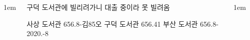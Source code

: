\documentclass[	20pt, 
							a1paper, 
							portrait, %
							margin=0mm, %
							innermargin=10mm,  		%
							blockverticalspace=4mm, %
							colspace=5mm, 
							subcolspace=0mm
							]{tikzposter}
\begin{document}
\begin{columns}
%


%
%
%
%
%
%
%
%






			{
					\setlength{\leftmargini}{4em}
					\setlength{\labelsep} {1em}
				\begin{LARGE}
구덕 도서관에 빌리려가니 대출 중이라 못 빌려옴

사상 도서관  656.8-김85오  
구덕 도서관  656.41  
부산 도서관  656.8-2020.-8  
				\end{LARGE}
			}






			{
					\setlength{\leftmargini}{4em}
					\setlength{\labelsep} {1em}
				\begin{LARGE}


\end{LARGE}}
\end{columns}
\end{document}
